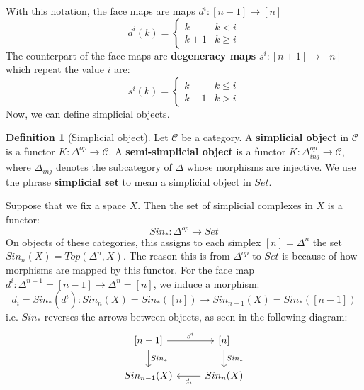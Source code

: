 \documentclass[11pt, oneside]{amsart}   	%
\theoremstyle{definition}
\newtheorem{definition}{Definition}[section]
\begin{document}
With this notation, the face maps are maps $d^i : [n - 1]\rightarrow [n]$
\begin{equation}
	d^i(k) = \begin{cases}
		k & k < i \\
		k + 1 & k\geq i
	\end{cases}
\end{equation}
The counterpart of the face maps are \textbf{degeneracy maps} $s^i : [n + 1]\rightarrow [n]$ which repeat the value $i$ are:
\begin{equation}
	s^i(k) = \begin{cases}
		k & k \leq i \\
		k - 1 & k > i
	\end{cases}
\end{equation}
Now, we can define simplicial objects.
\begin{definition}[Simplicial object]
	Let $\mathcal C$ be a category. A \textbf{simplicial object} in $\mathcal C$ is a functor $K : \Delta^{op}\rightarrow 
	\mathcal C$. A \textbf{semi-simplicial object} is a functor $K : \Delta_{inj}^{op}\rightarrow\mathcal C$, where 
	$\Delta_{inj}$ denotes the subcategory of $\Delta$ whose morphisms are injective. We use the phrase \textbf{simplicial 
	set} to mean a simplicial object in $Set$. 
\end{definition}

Suppose that we fix a space $X$. Then the set of simplicial complexes in $X$ is a functor:
\begin{equation}
	Sin_* : \Delta^{op}\rightarrow Set
\end{equation}
On objects of these categories, this assigns to each simplex $[n] = \Delta^n$ the set $Sin_n(X) = Top(\Delta^n, X)$. The 
reason this is from $\Delta^{op}$ to $Set$ is because of how morphisms are mapped by this functor. For the face map 
$d^i : \Delta^{n - 1} = [n - 1]\rightarrow \Delta^n = [n]$, we induce a morphism:
\begin{equation}
	d_i = Sin_*(d^i) : Sin_n(X) = Sin_*([n])\rightarrow Sin_{n - 1}(X) = Sin_*([n - 1])
\end{equation}
i.e. $Sin_*$ reverses the arrows between objects, as seen in the following diagram:
\begin{equation}\begin{tikzcd}
\left[ n - 1\right]\arrow[r, "d^i"]\arrow[d, "Sin_*"] & \left[ n\right]\arrow[d, "Sin_*"] \\
Sin_{n - 1}(X) & Sin_n(X) \arrow[l, "d_i"]
\end{tikzcd}\end{equation}
\end{document}

